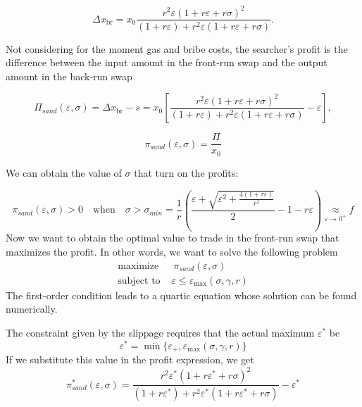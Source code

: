 \documentclass[a4paper,11pt]{article}
\begin{document}
\begin{equation}
\Delta x_{\text{br}} = x_0\frac{r^2 \varepsilon (1 + r\varepsilon + r\sigma)^2}{(1 + r\varepsilon) + r^2 \varepsilon (1 + r\varepsilon + r\sigma)}.
\end{equation}


Not considering for the moment gas and bribe costs, the searcher's profit is the difference between the input amount in the front-run swap and the output amount in the back-run swap

\begin{equation}
\Pi_{sand}(\varepsilon, \sigma) = \Delta x_{\text{br}} - s = x_0 \left[\frac{r^2 \varepsilon(1 + r\varepsilon + r\sigma)^2}{(1 + r\varepsilon) + r^2 \varepsilon (1 + r\varepsilon + r\sigma)} - \varepsilon \right]
,
\label{eq:Pi_exact}
\end{equation}

\begin{equation}
\pi_{sand}(\varepsilon, \sigma) = \frac{\Pi}{x_0}
\label{eq:pi_exact}
\end{equation}

We can obtain the value of $\sigma$ that turn on the profits:

\begin{equation}
    \pi_{sand}(\varepsilon, \sigma) >0 \quad \text{when} \quad \sigma>\sigma_{min} = \frac{1}{r}\left(\frac{\varepsilon+\sqrt{\varepsilon^2 + \frac{4(1+r\varepsilon)}{r^2}}}{2}-1 - r\varepsilon \right) \underset{\varepsilon\to0^+}\approx f
\end{equation}
Now we want to obtain the optimal value to trade in the front-run swap that maximizes the profit. In other words, we want to solve the following problem
\begin{align}
    \text{maximize } & \  \pi_{sand}(\varepsilon, \sigma) \nonumber\\ 
    \text{subject to } & \varepsilon \leq \varepsilon_{\text{max}}(\sigma, \gamma, r)
\end{align}
The first-order condition leads to a quartic equation whose solution can be found numerically. 

The constraint given by the slippage requires that the actual maximum $\varepsilon^*$ be
\begin{equation}
    \varepsilon^* = \min{\{\varepsilon_+, \varepsilon_{\text{max}}(\sigma, \gamma, r)\}}
\end{equation}
If we substitute this value in the profit expression, we get
\begin{equation}
    \pi_{sand}^*(\varepsilon,\sigma) = \frac{r^2 \varepsilon^* (1 + r\varepsilon^* + r\sigma)^2}{(1 + r\varepsilon^*) + r^2 \varepsilon^* (1 + r\varepsilon^* + r\sigma)} - \varepsilon^*
\end{equation}
\end{document}

